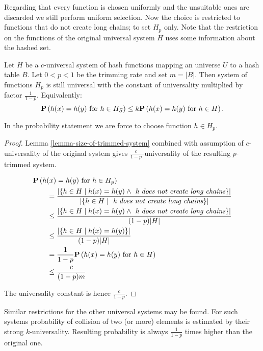 Regarding that every function is chosen uniformly and the unsuitable ones are discarded we still perform uniform selection. Now the choice is restricted to functions that do not create long chains; to set $H_p$ only. Note that the restriction on the functions of the original universal system $H$ uses some information about the hashed set.

\begin{theorem}
Let $H$ be a $c$-universal system of hash functions mapping an universe $U$ to a hash table $B$. Let $0 < p < 1$ be the trimming rate and set $m = |B|$. Then system of functions $H_p$ is still universal with the constant of universality multiplied by factor $\frac{1}{1 - p}$. Equivalently:
\[
	\mathbf{P}\left(h(x) = h(y) \text{ for } h \in H_S\right) \leq k \mathbf{P}\left(h(x) = h(y) \text{ for } h \in H\right) \text{.}
\]
\end{theorem}
In the probability statement we are force to choose function $h \in H_p$.
\begin{proof}
Lemma \ref{lemma-size-of-trimmed-system} combined with assumption of $c$-universality of the original system gives $\frac{c}{1 - p}$-universality of the resulting $p$-trimmed system. 

\[
\begin{split}
& \mathbf{P}\left(h(x) = h(y) \text{ for } h \in H_p\right)  \\
	& \qquad =  \frac{|\{ h \in H \mid h(x) = h(y) \wedge \textit{ h does not create long chains} \}|}{|\lbrace h \in H \mid \textit{ h does not create long chains} \rbrace|} \\
	& \qquad \leq \frac{|\{ h \in H \mid h(x) = h(y) \wedge \textit{ h does not create long chains} \}|}{(1 - p)|H|} \\ 
	& \qquad \leq \frac{|\{ h \in H \mid h(x) = h(y) \}|}{(1 - p)|H|} \\
	& \qquad = \frac{1}{1 - p} \mathbf{P}\left(h(x) = h(y) \text{ for } h \in H\right) \\
	& \qquad \leq \frac{c}{(1 - p) m} \\
\end{split}
\]

The universality constant is hence $\frac{c}{1 - p}$.
\end{proof}

Similar restrictions for the other universal systems may be found. For such systems probability of collision of two (or more) elements is estimated by their strong $k$-universality. Resulting probability is always $\frac{1}{1 - p}$ times higher than the original one.

